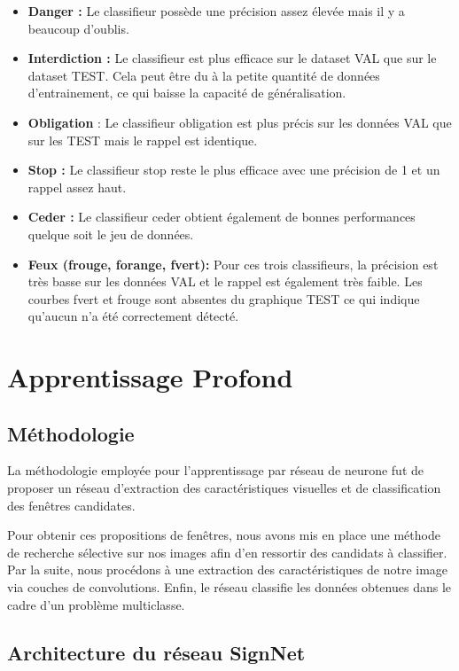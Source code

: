 \documentclass[a4paper,11pt]{article}
\begin{document}
\begin{itemize}[noitemsep]
    \item \textbf{Danger :} Le classifieur possède une précision assez élevée mais il y a beaucoup d'oublis.
    \item \textbf{Interdiction :} Le classifieur est plus efficace sur le dataset VAL que sur le dataset TEST. Cela peut être du à la petite quantité de données d'entrainement, ce qui baisse la capacité de généralisation.
    \item \textbf{Obligation} : Le classifieur obligation est plus précis sur les données VAL que sur les TEST mais le rappel est identique. 
    \item \textbf{Stop :} Le classifieur stop reste le plus efficace avec une précision de 1 et un rappel assez haut.
    \item \textbf{Ceder :} Le classifieur ceder obtient également de bonnes performances quelque soit le jeu de données.
    \item \textbf{Feux (frouge, forange, fvert):} Pour ces trois classifieurs, la précision est très basse sur les données VAL et le rappel est également très faible. Les courbes fvert et frouge sont absentes du graphique TEST ce qui indique qu'aucun n'a été correctement détecté. 
\end{itemize}


\section{Apprentissage Profond}

\subsection{Méthodologie}

La méthodologie employée pour l'apprentissage par réseau de neurone fut de proposer un réseau d'extraction des caractéristiques visuelles et de classification des fenêtres candidates.

\noindent Pour obtenir ces propositions de fenêtres, nous avons mis en place une méthode de recherche sélective sur nos images afin d'en ressortir des candidats à classifier. Par la suite, nous procédons à une extraction des caractéristiques de notre image via couches de convolutions. Enfin, le réseau classifie les données obtenues dans le cadre d'un problème multiclasse. 

\subsection{Architecture du réseau SignNet}
\end{document}
